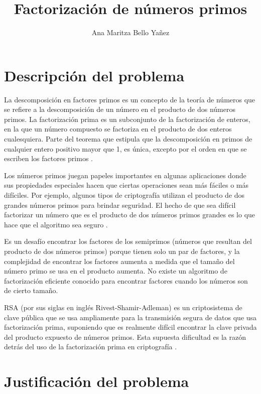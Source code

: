 \documentclass{article}
\begin{document}
\title{Factorización de números primos}
\author{Ana Maritza Bello Yañez}
\maketitle

\tableofcontents

\section{Descripción del problema}

La descomposición en factores primos es un concepto de la teoría de números que
se refiere a la descomposición de un número en el producto de dos números
primos. La factorización prima es un subconjunto de la factorización de enteros,
en la que un número compuesto se factoriza en el producto de dos enteros
cualesquiera. Parte del teorema que estipula que la descomposición en primos de
cualquier entero positivo mayor que 1, es única, excepto por el orden en que se
escriben los factores primos \cite{lewinter2015elementary}.

Los números primos juegan papeles importantes en algunas aplicaciones donde sus
propiedades especiales hacen que ciertas operaciones sean más fáciles o más
difíciles. Por ejemplo, algunos tipos de criptografía utilizan el producto de
dos grandes números primos para brindar seguridad. El hecho de que sea difícil
factorizar un número que es el producto de dos números primos grandes es lo que
hace que el algoritmo sea seguro \cite{stephens2019essential}.

Es un desafío encontrar los factores de los semiprimos (números que resultan del
producto de dos números primos) porque tienen solo un par de factores, y la
complejidad de encontrar los factores aumenta a medida que el tamaño del número
primo se usa en el producto aumenta. No existe un algoritmo de factorización
eficiente conocido para encontrar factores cuando los números son de cierto
tamaño. 

RSA (por sus siglas en inglés Rivest-Shamir-Adleman) es un criptosistema de
clave pública que se usa ampliamente para la transmisión segura de datos que usa
factorización prima, suponiendo que es realmente difícil encontrar la clave
privada del producto expuesto de números primos. Esta supuesta dificultad es la
razón detrás del uso de la factorización prima en criptografía
\cite{raj2019foundations}.


\section{Justificación del problema}
\end{document}
